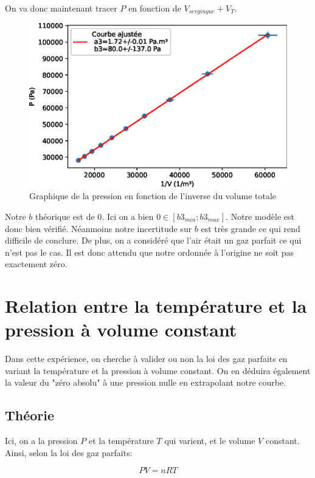\documentclass[12pt]{article}
\begin{document}
On va donc maintenant tracer $P$ en fonction de $V_{sergingue}+V_T$.
\begin{figure}[h!]
	\begin{center}
		\includegraphics[scale=1]{img/G3Exp1.eps}
		\caption{Graphique de la pression en fonction de l'inverse du volume totale}
	\end{center}
\end{figure}

Notre $b$ théorique est de 0. Ici on a bien $0\in [b3_{min};b3_{max}]$. Notre modèle est donc bien vérifié. Néanmoins notre incertitude sur $b$ est très grande ce qui rend difficile de conclure. De plus, on a considéré que l'air était un gaz parfait ce qui n'est pas le cas. Il est donc attendu que notre ordonnée à l'origine ne soit pas exactement zéro.  

\newpage
\section{Relation entre la température et la pression à volume constant}
Dans cette expérience, on cherche à valider ou non la loi des gaz parfaits en variant la température et la pression
à volume constant. On en déduira également la valeur du "zéro absolu" à une pression nulle en extrapolant notre courbe.

\subsection{Théorie}
Ici, on a la pression $P$ et la température $T$ qui varient, et le volume $V$ constant. Ainsi, selon la loi des gaz parfaits:

\begin{equation}
    PV = nRT
\end{equation}
\end{document}
